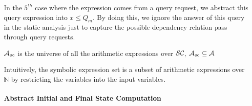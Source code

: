 In the $5^{th}$ case where the expression comes from a query request, we abstract this query expression into $x \leq Q_m$.
By doing this, we ignore the answer of this query in the static analysis just to capture the possible dependency relation pass through query requests.
\begin{defn}
 \label{def:symbolic_expr_domain}
 $\mathcal{A}_{\mathtt{sc}}$ is the universe of all the arithmetic expressions 
over $\mathcal{SC}$, $\mathcal{A}_{\mathtt{sc}} \subseteq \mathcal{A}$
\end{defn}
Intuitively, the symbolic expression set is a subset of arithmetic expressions over $\mathbb{N}$
by restricting the variables into the
input variables.

\paragraph{Abstract Initial and Final State Computation}

